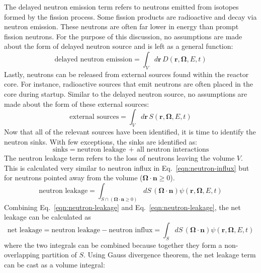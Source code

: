 The delayed neutron emission term refers to neutrons emitted from isotopes formed by the fission process. Some fission products are radioactive and decay via neutron emission. These neutrons are often far lower in energy than prompt fission neutrons. For the purpose of this discussion, no assumptions are made about the form of delayed neutron source and is left as a general function:
\begin{equation}
\text{delayed neutron emission} = \int_V d\mathbf{r} \, D(\mathbf{r}, \mathbf{\Omega}, E, t)
\end{equation}
Lastly, neutrons can be released from external sources found within the reactor core. For instance, radioactive sources that emit neutrons are often placed in the core during startup. Similar to the delayed neutron source, no assumptions are made about the form of these external sources:
\begin{equation}
\text{external sources} = \int_V d\mathbf{r} \, S(\mathbf{r}, \mathbf{\Omega}, E, t)
\end{equation}
Now that all of the relevant sources have been identified, it is time to identify the neutron sinks. With few exceptions, the sinks are identified as:
\begin{equation}
\text{sinks} = \text{neutron leakage} \, + \, \text{all neutron interactions}
\end{equation}
The neutron leakage term refers to the loss of neutrons leaving the volume $V$. This is calculated very similar to neutron influx in Eq.~\ref{eqn:neutron-influx} but for neutrons pointed away from the volume ($\mathbf{\Omega} \cdot \mathbf{n} \geq 0$).
\begin{equation}
\text{neutron leakage} = \int_{S \cap \left(\mathbf{\Omega} \cdot \mathbf{n} \geq 0 \right)} dS \, \left(\mathbf{\Omega} \cdot \mathbf{n} \right) \psi(\mathbf{r}, \mathbf{\Omega}, E, t)
\label{eqn:neutron-leakage}
\end{equation}
Combining Eq.~\ref{eqn:neutron-leakage} and Eq.~\ref{eqn:neutron-leakage}, the net leakage can be calculated as
\begin{equation}
\text{net leakage} = \text{neutron leakage} - \text{neutron influx} = \int_{S} dS \, \left(\mathbf{\Omega} \cdot \mathbf{n} \right) \psi(\mathbf{r}, \mathbf{\Omega}, E, t)
\label{eqn:net-leakage-surf}
\end{equation}
where the two integrals can be combined because together they form a non-overlapping partition of $S$. Using Gauss divergence theorem, the net leakage term can be cast as a volume integral:
